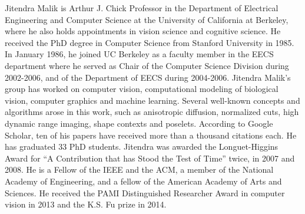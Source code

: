 \documentclass[10pt,journal,cspaper,compsoc]{IEEEtran}
\begin{document}
\begin{IEEEbiography}
{Jitendra Malik} is Arthur J. Chick Professor in the Department of Electrical Engineering and Computer Science at the University of California at Berkeley, where he also holds appointments in vision science and cognitive science. He received the PhD degree in Computer Science from Stanford University in 1985. In January 1986, he joined UC Berkeley as a faculty member in the EECS department where he served as Chair of the Computer Science Division during 2002-2006, and of the Department of EECS during 2004-2006. Jitendra Malik's group has worked on computer vision, computational modeling of biological vision, computer graphics and machine learning. Several well-known concepts and algorithms arose in this work, such as anisotropic diffusion, normalized cuts, high dynamic range imaging, shape contexts and poselets. According to Google Scholar, ten of his papers have received more than a thousand citations each. He has graduated 33 PhD students. Jitendra was awarded the Longuet-Higgins Award for ``A Contribution that has Stood the Test of Time'' twice, in 2007 and 2008. He is a Fellow of the IEEE and the ACM, a member of the National Academy of Engineering, and a fellow of the American Academy of  Arts and Sciences. He received the PAMI Distinguished Researcher Award in computer vision in 2013 and the K.S. Fu prize in 2014.
\end{IEEEbiography}
\end{document}
